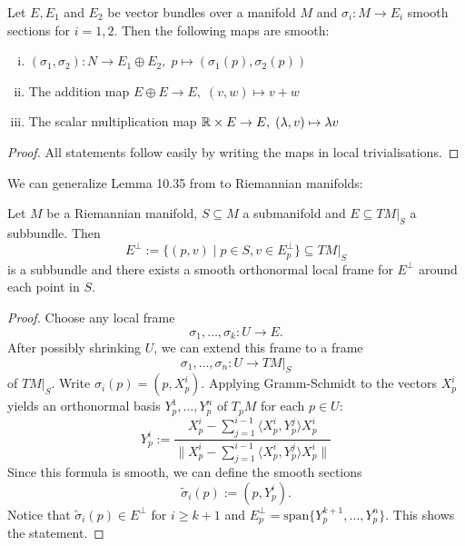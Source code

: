     \begin{lemma}
        Let $E, E_1$ and $E_2$ be vector bundles over a manifold $M$ and $\sigma_i \colon M \to E_i$ smooth sections for $i = 1,2$. Then the following maps are smooth:
        \begin{enumerate}[(i)]
            \item $(\sigma_1,\sigma_2) \colon N \to E_1 \oplus E_2, \; p \mapsto (\sigma_1(p),\sigma_2(p))$
            \item The addition map $E \oplus E \to E, \; (v,w) \mapsto v+w$
            \item The scalar multiplication map $\mathbb{R} \times E \to E,\; (\lambda,v) \mapsto \lambda v$
        \end{enumerate}
    \end{lemma}
    \begin{proof}
        All statements follow easily by writing the maps in local trivialisations.
    \end{proof}



    We can generalize Lemma 10.35 from \cite{lee2011smooth} to Riemannian manifolds:

    \begin{lemma}
        \label{lem:orthogonal_complement_bundles}
        Let $M$ be a Riemannian manifold, $S \subseteq M$ a submanifold and $E \subseteq TM|_S$ a subbundle. Then
        \[
        E^\perp := \{(p,v) \mid p \in S, v \in E_p^\perp\} \subseteq TM|_S
        \]
        is a subbundle and there exists a smooth orthonormal local frame for $E^\perp$ around each point in $S$.
    \end{lemma}
    \begin{proof}
        Choose any local frame 
        \[\sigma_1,\ldots,\sigma_k \colon U \to E.\]
        After possibly shrinking $U$, we can extend this frame to a frame 
        \[\sigma_1,\ldots,\sigma_n \colon U \to TM|_S\]
        of $TM|_S$. Write $\sigma_i(p) = (p,X_p^i)$. Applying Gramm-Schmidt to the vectors $X_p^i$ yields an orthonormal basis $Y_p^1,\ldots,Y_p^n$ of $T_pM$ for each $p \in U$:
        \[Y_p^i := \frac{X_p^i - \sum_{j=1}^{i-1}\langle X_p^i,Y_p^{j} \rangle X_p^i}{\lVert X_p^i - \sum_{j=1}^{i-1}\langle X_p^i,Y_p^{j} \rangle X_p^i \rVert}\]
        Since this formula is smooth, we can define the smooth sections 
        \[\tilde{\sigma}_i(p) := (p,Y_p^i).\]
        Notice that $\tilde{\sigma}_i(p) \in E^\perp$ for $i \geq k+1$ and $E_p^\perp = \mathrm{span}\{Y_p^{k+1},\ldots,Y_p^n\}$. This shows the statement. 
    \end{proof}


